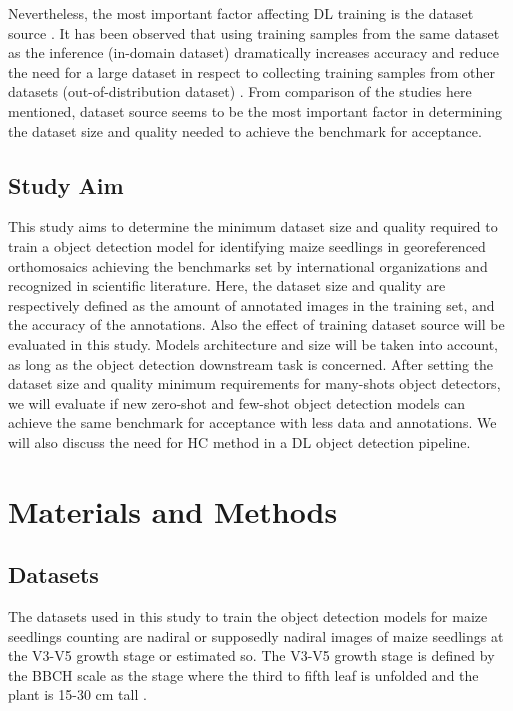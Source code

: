\documentclass[journal,article,submit,pdftex,moreauthors]{Definitions/mdpi}
\begin{document}
Nevertheless, the most important factor affecting DL training is the dataset source 
\cite{sunRevisitingUnreasonableEffectiveness2017}. 
It has been observed that using training samples from the same
dataset as the inference (in-domain dataset) dramatically increases accuracy and reduce the need 
for a large dataset in respect to collecting training samples from other 
datasets (out-of-distribution dataset) \cite{davidPlantDetectionCounting2021,andvaagCountingCanolaGeneralizable2024}. 
From comparison of the studies here mentioned, dataset source seems to be the most 
important factor in determining the dataset size and quality needed to achieve the benchmark 
for acceptance.

\subsection{Study Aim}

This study aims to determine the minimum dataset size and quality required to train 
a object detection model for identifying maize seedlings in georeferenced orthomosaics
achieving the benchmarks set by international organizations and recognized in scientific literature.
Here, the dataset size and quality are respectively defined as the amount of annotated 
images in the training set, and the accuracy of the annotations.
Also the effect of training dataset source will be evaluated in this study.
Models architecture and size will be taken into account, as long as the object detection
downstream task is concerned. 
After setting the dataset size and quality minimum requirements for many-shots
object detectors, we will evaluate if new zero-shot and few-shot object detection
models can achieve the same benchmark for acceptance with less data and annotations.
We will also discuss the need for HC method in a DL object detection pipeline.

\section{Materials and Methods}

\subsection{Datasets}
The datasets used in this study to train the object detection models for maize seedlings
counting are nadiral or supposedly nadiral images of maize seedlings at the V3-V5 growth stage
or estimated so.
The V3-V5 growth stage is defined by the BBCH scale as the stage where the third to fifth
leaf is unfolded and the plant is 15-30 cm tall \cite{meierBBCHSystemCoding2009}.
\end{document}
